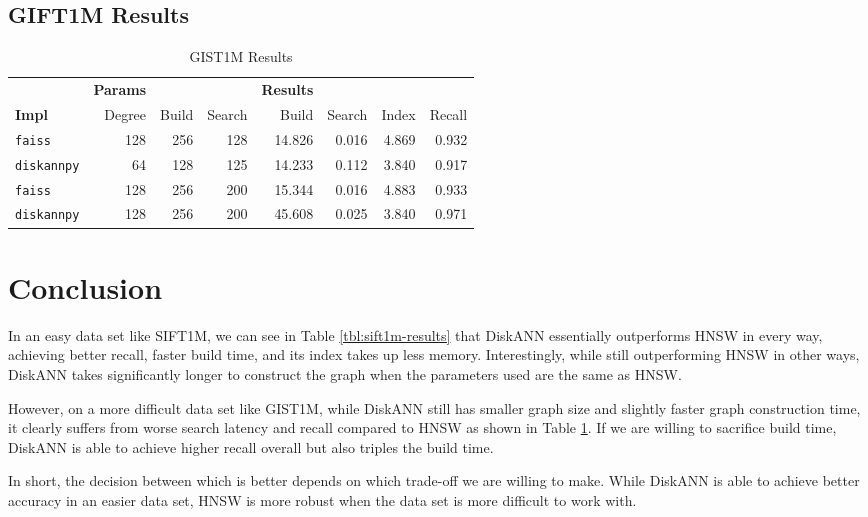 \subsection{GIFT1M Results}

\begin{table}[ht]
    \centering
    \caption{GIST1M Results}
    \label{tbl:gist1m-results}
    \begin{tabular}{l|rrr|rrrr}
        \toprule
        & \textbf{Params} & & & \textbf{Results} & & \\
        \textbf{Impl} & Degree & Build & Search & Build & Search & Index & Recall \\
        \midrule
        \texttt{faiss} & 128 & 256 & 128 & 14.826 & 0.016 & 4.869 & 0.932 \\
        \texttt{diskannpy} & 64 & 128 & 125 & 14.233 & 0.112 & 3.840 & 0.917 \\
        \midrule
        \texttt{faiss} & 128 & 256 & 200 & 15.344 & 0.016 & 4.883 & 0.933 \\
        \texttt{diskannpy} & 128 & 256 & 200 & 45.608 & 0.025 & 3.840 & 0.971 \\
        \bottomrule
    \end{tabular}
\end{table}


\section{Conclusion}

In an easy data set like SIFT1M, we can see in Table \ref{tbl:sift1m-results} that DiskANN essentially outperforms HNSW in every way, achieving better recall, faster build time, and its index takes up less memory. Interestingly, while still outperforming HNSW in other ways, DiskANN takes significantly longer to construct the graph when the parameters used are the same as HNSW.

However, on a more difficult data set like GIST1M, while DiskANN still has smaller graph size and slightly faster graph construction time, it clearly suffers from worse search latency and recall compared to HNSW as shown in Table \ref{tbl:gist1m-results}. If we are willing to sacrifice build time, DiskANN is able to achieve higher recall overall but also triples the build time.

In short, the decision between which is better depends on which trade-off we are willing to make. While DiskANN is able to achieve better accuracy in an easier data set, HNSW is more robust when the data set is more difficult to work with.

